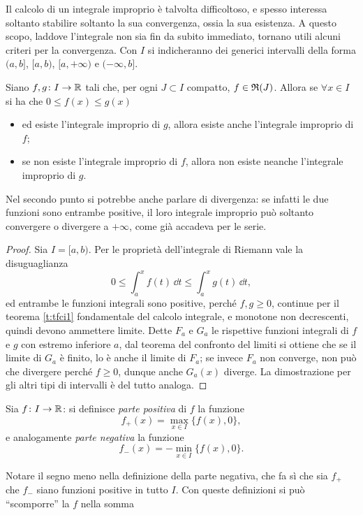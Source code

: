 Il calcolo di un integrale improprio è talvolta difficoltoso, e spesso interessa soltanto stabilire soltanto la sua convergenza, ossia la sua esistenza. A questo scopo, laddove l'integrale non sia fin da subito immediato, tornano utili alcuni criteri per la convergenza. Con $I$ si indicheranno dei generici intervalli della forma $(a,b]$, $[a,b)$, $[a,+\infty)$ e $(-\infty,b]$.
\begin{teorema} \label{t:confronto_int1}
	Siano $f,g\colon I\to\mathbb{R}$ tali che, per ogni $J\subset I$ compatto, $f\in\mathfrak{R}(J)$. Allora se $\forall x\in I$ si ha che $0\leq f(x)\leq g(x)$
	\begin{itemize}
		\item ed esiste l'integrale improprio di $g$, allora esiste anche l'integrale improprio di $f$;
		\item se non esiste l'integrale improprio di $f$, allora non esiste neanche l'integrale improprio di $g$.
	\end{itemize}
\end{teorema}
Nel secondo punto si potrebbe anche parlare di divergenza: se infatti le due funzioni sono entrambe positive, il loro integrale improprio può soltanto convergere o divergere a $+\infty$, come già accadeva per le serie.
\begin{proof}
	Sia $I=[a,b)$. Per le proprietà dell'integrale di Riemann vale la disuguaglianza
	\[
	0\leq\int_a^xf(t)\,\dd t\leq\int_a^xg(t)\,\dd t,
	\]
	ed entrambe le funzioni integrali sono positive, perché $f,g\geq 0$, continue per il teorema \ref{t:tfci1} fondamentale del calcolo integrale, e monotone non decrescenti, quindi devono ammettere limite.
	Dette $F_a$ e $G_a$ le rispettive funzioni integrali di $f$ e $g$ con estremo inferiore $a$, dal teorema del confronto del limiti si ottiene che se il limite di $G_a$ è finito, lo è anche il limite di $F_a$; se invece $F_a$ non converge, non può che divergere perché $f\ge 0$, dunque anche $G_a(x)$ diverge.
	La dimostrazione per gli altri tipi di intervalli è del tutto analoga.
\end{proof}
\begin{definizione}
Sia $f\colon I\to\mathbb{R}$: si definisce \emph{parte positiva} di $f$ la funzione
\[
f_+(x)=\max_{x\in I}\{f(x),0\},
\]
e analogamente \emph{parte negativa} la funzione
\[
f_-(x)=-\min_{x\in I}\{f(x),0\}.
\]
\end{definizione}
Notare il segno meno nella definizione della parte negativa, che fa sì che sia $f_+$ che $f_-$ siano funzioni positive in tutto $I$. Con queste definizioni si può ``scomporre'' la $f$ nella somma
